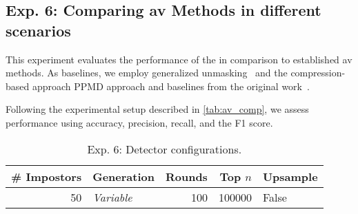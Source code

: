 \subsection{Exp. 6: Comparing \ac{av} Methods in different scenarios}

This experiment evaluates the performance of the \impAppr{} in comparison to established \ac{av} methods.
As baselines, we employ generalized unmasking~\citep{bevendorff_generalizing_2019} and the compression-based approach PPMD approach and baselines from the original work~\citep{koppel_determining_2014}.

Following the experimental setup described in \autoref{tab:av_comp}, we assess performance using  accuracy, precision, recall, and the F1 score. 

\begin{table}[h]
\centering\small
\caption{Exp. 6: Detector configurations.}
\label{tab:av_comp}
\begin{tabular}{@{}rlrrl@{}}   %
\toprule
\# Impostors & Generation & Rounds & Top $n$ & Upsample \\
\midrule
50 & \textit{Variable} & 100 & \num{100000} & False \\
\bottomrule
\end{tabular}%
\end{table}